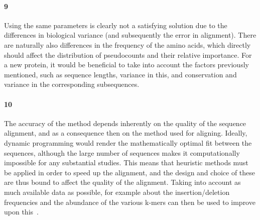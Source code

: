 \documentclass[11pt]{article}\usepackage[]{graphicx}\usepackage[]{color}
\theoremstyle{plain}
\begin{document}
\begin{multicols*}{2}
	\paragraph{9}
	
	Using the same parameters is clearly not a satisfying solution due to the differences in biological variance (and subsequently the error in alignment). There are naturally also differences in the frequency of the amino acids, which directly should affect the distribution of pseudocounts and their relative importance. For a new protein, it would be beneficial to take into account the factors previously mentioned, such as sequence lengths, variance in this, and conservation and variance in the corresponding subsequences.
	
	
	\paragraph{10}
	
	The accuracy of the method depends inherently on the quality of the sequence alignment, and as a consequence then on the method used for aligning. Ideally, dynamic programming would render the mathematically optimal fit between the sequences, although the large number of sequences makes it computationally impossible for any substantial studies. This means that heuristic methods must be applied in order to speed up the alignment, and the design and choice of these are thus bound to affect the quality of the alignment. Taking into account as much available data as possible, for example about the insertion/deletion frequencies and the abundance of the various k-mers can then be used to improve upon this~\cite{thompson1994clustal}. 
	

\end{multicols*}
\end{document}
